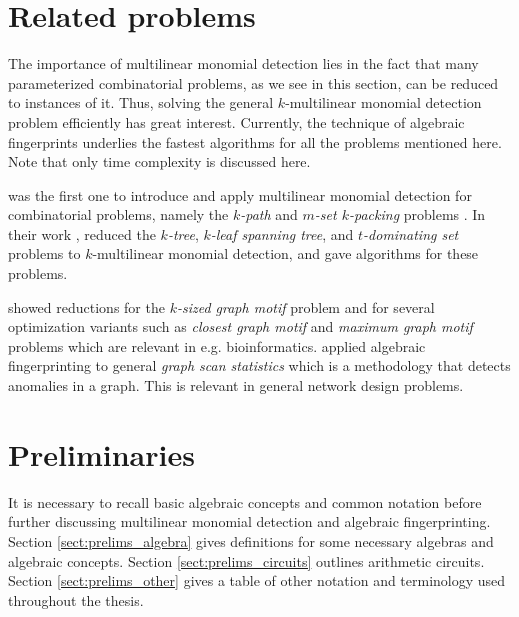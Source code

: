 \section{Related problems}
\label{sect:related_problems}

The importance of multilinear monomial detection lies in the fact 
that many parameterized combinatorial problems, as we see in this section, 
can be reduced to instances of it. 
Thus, solving the general $k$-multilinear monomial detection problem 
efficiently has great interest. 
Currently, the technique of algebraic fingerprints underlies the fastest algorithms 
for all the problems mentioned here. 
Note that only time complexity is discussed here. 

\citeauthor{Koutis08} was the first one to introduce and apply multilinear monomial 
detection for combinatorial problems, namely the \emph{$k$-path} and \emph{$m$-set $k$-packing} problems 
\cite{Koutis08}. 
In their work \cite{KouWil09}, \citeauthor{KouWil09} reduced 
the \emph{$k$-tree}, \emph{$k$-leaf spanning tree}, and \emph{$t$-dominating set} problems 
to $k$-multilinear monomial detection, and 
gave  algorithms for these problems.  

\citeauthor{Björklund16} \cite{Björklund16} showed reductions for the 
\emph{$k$-sized graph motif} problem and for
several optimization variants such as \emph{closest graph motif} 
and \emph{maximum graph motif} problems which are relevant in e.g. bioinformatics. 
\citeauthor{Cadena17} \cite{Cadena17} 
applied algebraic fingerprinting to general \emph{graph scan statistics} 
which is a methodology that detects anomalies in a graph. This is relevant in 
general network design problems.

\section{Preliminaries}
\label{sect:prelims}

It is necessary to recall basic algebraic concepts and common notation 
before further discussing multilinear monomial detection and algebraic fingerprinting. 
Section \ref{sect:prelims_algebra} gives definitions for some necessary algebras 
and algebraic concepts. Section \ref{sect:prelims_circuits} outlines arithmetic circuits. 
Section \ref{sect:prelims_other} gives a table of other notation and terminology used 
throughout the thesis.

